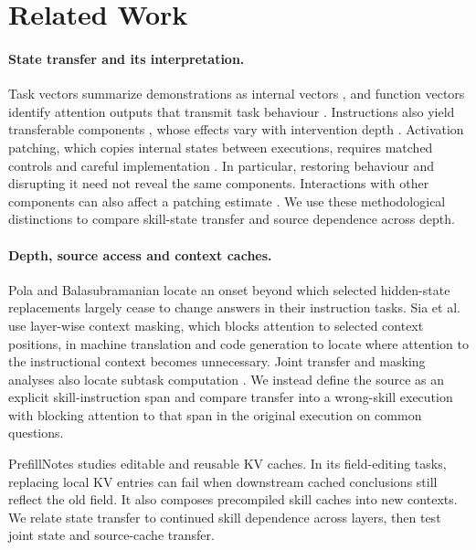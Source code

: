 \section{Related Work}
\label{sec:related}

\paragraph{State transfer and its interpretation.}
Task vectors summarize demonstrations as internal vectors
\citep{hendel2023taskvectors}, and function vectors identify attention
outputs that transmit task behaviour \citep{todd2024functionvectors}.
Instructions also yield transferable components
\citep{davidson2025prompting,bigoulaeva2026instructionvectors}, whose effects
vary with intervention depth \citep{jit2025taskrepr}. Activation patching,
which copies internal states between executions, requires matched controls
and careful implementation
\citep{zhang2023bestpractices,heimersheim2024patching}. In particular,
restoring behaviour and disrupting it need not reveal the same components.
Interactions with other components can also affect a patching estimate
\citep{vaidyanathan2026mediators}. We use these methodological distinctions to compare skill-state transfer
and source dependence across depth.

\paragraph{Depth, source access and context caches.}
Pola and Balasubramanian \citep{onset2025instruction} locate an onset beyond
which selected hidden-state replacements largely cease to change answers in their
instruction tasks. Sia et al.\ \citep{sia2024incontexttranslation} use
layer-wise context masking, which blocks attention to selected context
positions, in machine translation and code generation to
locate where attention to the instructional context becomes unnecessary.
Joint transfer and masking analyses also locate subtask computation
\citep{yang2025internalcot}. We instead define the source as an explicit
skill-instruction span and compare transfer into a wrong-skill execution
with blocking attention to that span in the original execution on common questions.

PrefillNotes \citep{li2026prefillnotes} studies editable and reusable KV
caches. In its field-editing tasks, replacing local KV entries can fail
when downstream cached conclusions still reflect the old field. It also
composes precompiled skill caches into new contexts. We relate state transfer
to continued skill dependence across layers, then test joint state and
source-cache transfer.

